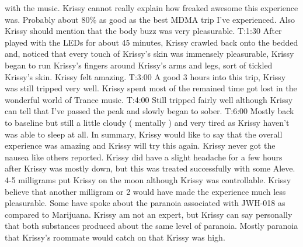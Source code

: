 \documentclass[12pt]{book}
\begin{document}
with the music. Krissy cannot really explain how freaked awesome this experience was. Probably about 80\% as good as the best MDMA trip I've experienced. Also Krissy should mention that the body buzz was very pleasurable. T:1:30 After played with the LEDs for about 45 minutes, Krissy crawled back onto the bedded and, noticed that every touch of Krissy's skin was immensely pleasurable, Krissy began to run Krissy's fingers around Krissy's arms and legs, sort of tickled Krissy's skin. Krissy felt amazing. T:3:00 A good 3 hours into this trip, Krissy was still tripped very well. Krissy spent most of the remained time got lost in the wonderful world of Trance music. T:4:00 Still tripped fairly well although Krissy can tell that I've passed the peak and slowly began to sober. T:6:00 Mostly back to baseline but still a little cloudy ( mentally ) and very tired as Krissy haven't was able to sleep at all. In summary, Krissy would like to say that the overall experience was amazing and Krissy will try this again. Krissy never got the nausea like others reported. Krissy did have a slight headache for a few hours after Krissy was mostly down, but this was treated successfully with some Aleve. 4-5 milligrams put Krissy on the moon although Krissy was controllable. Krissy believe that another milligram or 2 would have made the experience much less pleasurable. Some have spoke about the paranoia associated with JWH-018 as compared to Marijuana. Krissy am not an expert, but Krissy can say personally that both substances produced about the same level of paranoia. Mostly paranoia that Krissy's roommate would catch on that Krissy was high.
\end{document}
